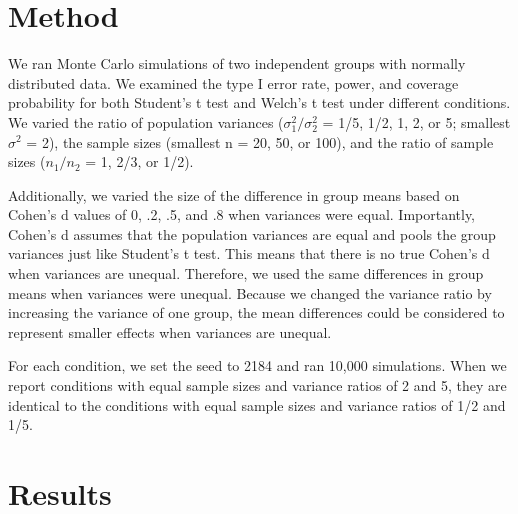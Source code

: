 \documentclass[man,a4paper,noextraspace,apacite]{apa6}\usepackage[]{graphicx}\usepackage[]{color}
\begin{document}
\section{Method}

    We ran Monte Carlo simulations of two independent groups with normally distributed data. We examined the type I error rate, power, and coverage probability for both Student's t test and Welch's t test under different conditions. We varied the ratio of population variances ($\sigma_{1}^2/\sigma_{2}^2$ = 1/5, 1/2, 1, 2, or 5; smallest $\sigma^2$ = 2), the sample sizes (smallest n = 20, 50, or 100), and the ratio of sample sizes ($n_{1}/n_{2}$ = 1, 2/3, or 1/2). 
    
    Additionally, we varied the size of the difference in group means based on Cohen's d values of 0, .2, .5, and .8 when variances were equal. Importantly, Cohen's d assumes that the population variances are equal and pools the group variances just like Student's t test. This means that there is no true Cohen's d when variances are unequal. Therefore, we used the same differences in group means when variances were unequal. Because we changed the variance ratio by increasing the variance of one group, the mean differences could be considered to represent smaller effects when variances are unequal.
    
    For each condition, we set the seed to 2184 and ran 10,000 simulations. When we report conditions with equal sample sizes and variance ratios of 2 and 5, they are identical to the conditions with equal sample sizes and variance ratios of 1/2 and 1/5. 

\section{Results}   
\end{document}
